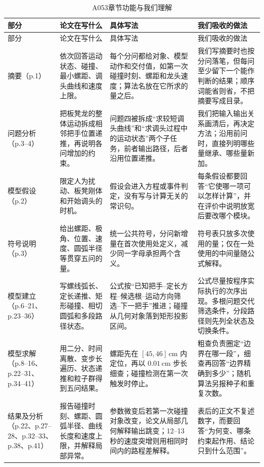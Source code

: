 \documentclass[UTF8,zihao=-4]{ctexart}
\begin{document}
\small
\begin{longtable}{p{2.25cm}p{4.0cm}p{5.1cm}p{4.2cm}}
\caption{A053章节功能与我们理解}\label{tab:a053-structure}\\
\toprule
部分 & 论文在写什么 & 具体写法 & 我们吸收的做法\\
\midrule
\endfirsthead
\toprule
部分 & 论文在写什么 & 具体写法 & 我们吸收的做法\\
\midrule
\endhead
\bottomrule
\endfoot
摘要（p.1）
& 依次回答运动状态、碰撞、最小螺距、调头曲线和速度上限。
& 每个分问都给对象、模型动作和交付值，如第一次碰撞时刻、螺距和龙头速度；算法名放在它所求的量之后。
& 我们写摘要时也按分问落笔，但每问至少留下一个能作判断的结果；顺序词能省则省，不把摘要写成目录。\\

问题分析（p.3--4）
& 把板凳龙的整体运动拆成相邻把手位置递推，再说明各问增加的约束。
& 问题四被拆成“求较短调头曲线”和“求调头过程中的运动状态”两个子任务，前者输出路径，后者沿用位置递推。
& 我们把输入输出关系画清后，再决定方法；沿用前问时，直接列明哪些量继承、哪些量新加。\\

模型假设（p.2）
& 限定人为扰动、板凳刚体和开始调头的时机。
& 假设会进入方程或事件判定，没有写与计算无关的常识句。
& 每条假设都要回答“它使哪一项可以怎样计算”，并在评价中说明放宽后要改哪个模块。\\

符号说明（p.3）
& 给出螺距、极角、位置、速度、圆弧半径等贯穿五问的量。
& 统一公共符号，分问新增量在首次使用处定义，减少同一字母承担两个含义。
& 符号表只放多次使用的量；仅在一处使用的中间量随公式解释。\\

模型建立（p.6--21、p.23--36）
& 写螺线弧长、定长递推、矩形碰撞、相切圆弧和多段路径状态。
& 公式按“已知把手--定长方程--候选根--运动方向筛选--下一把手”推进；碰撞从几何对象落到矩形投影区间。
& 公式尽量按程序实际执行的次序出现。多根问题交代筛选条件，分段路径则先列全状态及切换条件。\\

模型求解（p.8--16、p.22--31、p.34--41）
& 用二分、时间离散、变步长遍历、状态递推和粒子群得到五问结果。
& 螺距先在 $[45,46]\,\mathrm{cm}$ 内定位，再以 $0.01\,\mathrm{cm}$ 步长细查；碰撞检测在第一次触发时停止。
& 粗查负责圈定“边界在哪一段”，细查再回答“边界精确到多少”；随机算法另报种子和重复次数。\\

结果及分析（p.22、p.27--28、p.32--33、p.38、p.41）
& 报告碰撞时刻、螺距、圆弧半径、曲线长度和速度上限，并解释局部异常。
& 参数微变后若第一次碰撞对象改变，论文从局部几何解释输出跳变；12--13秒的速度突增则用相同时间内的路程差解释。
& 表后的正文不复述数字，而要回答“为何变、哪条约束起作用、结论只到什么范围”。\\


\end{longtable}
\end{document}
